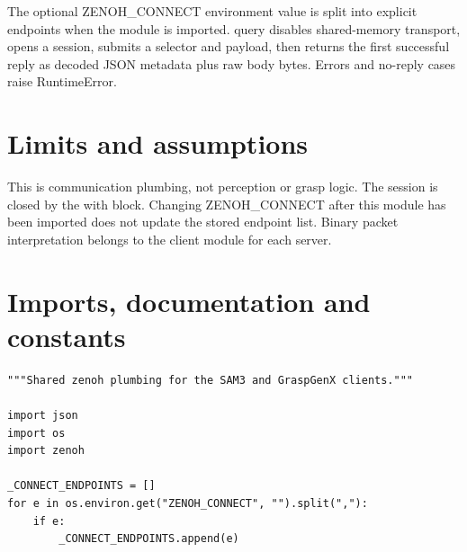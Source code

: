 \documentclass[11pt,a4paper]{book}
\begin{document}
The optional ZENOH\_CONNECT environment value is split into explicit endpoints when the module is imported. query disables shared-memory transport, opens a session, submits a selector and payload, then returns the first successful reply as decoded JSON metadata plus raw body bytes. Errors and no-reply cases raise RuntimeError.

\section*{Limits and assumptions}

This is communication plumbing, not perception or grasp logic. The session is closed by the with block. Changing ZENOH\_CONNECT after this module has been imported does not update the stored endpoint list. Binary packet interpretation belongs to the client module for each server.

\section{Imports, documentation and constants}

\begin{lstlisting}[firstnumber=1]
"""Shared zenoh plumbing for the SAM3 and GraspGenX clients."""

import json
import os
import zenoh

_CONNECT_ENDPOINTS = []
for e in os.environ.get("ZENOH_CONNECT", "").split(","):
    if e:
        _CONNECT_ENDPOINTS.append(e)


\end{lstlisting}
\end{document}
